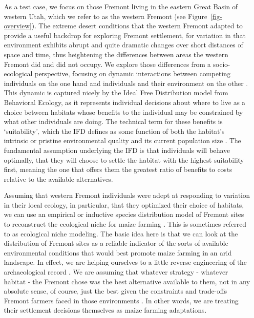 \documentclass[
  number,
  preprint,
  3p]{elsarticle}
\begin{document}
As a test case, we focus on those Fremont living in the eastern Great
Basin of western Utah, which we refer to as the western Fremont (see
Figure~\ref{fig-overview}). The extreme desert conditions that the
western Fremont adapted to provide a useful backdrop for exploring
Fremont settlement, for variation in that environment exhibits abrupt
and quite dramatic changes over short distances of space and time, thus
heightening the differences between areas the western Fremont did and
did not occupy. We explore those differences from a socio-ecological
perspective, focusing on dynamic interactions between competing
individuals on the one hand and individuals and their environment on the
other \citep{bird2006, kennett2006a}. This dynamic is captured nicely by
the Ideal Free Distribution model from Behavioral Ecology, as it
represents individual decisions about where to live as a choice between
habitats whose benefits to the individual may be constrained by what
other individuals are doing. The technical term for these benefits is
`suitability', which the IFD defines as some function of both the
habitat's intrinsic or pristine environmental quality and its current
population size \citep{fretwell1969, codding2015, winterhalder2010}. The
fundamental assumption underlying the IFD is that individuals will
behave optimally, that they will choose to settle the habitat with the
highest suitability first, meaning the one that offers them the greatest
ratio of benefits to costs relative to the available alternatives.

Assuming that western Fremont individuals were adept at responding to
variation in their local ecology, in particular, that they optimized
their choice of habitats, we can use an empirical or inductive species
distribution model of Fremont sites to reconstruct the ecological niche
for maize farming \citep{vernon2021, yaworsky2020, elith2009}. This is
sometimes referred to as ecological niche modeling. The basic idea here
is that we can look at the distribution of Fremont sites as a reliable
indicator of the sorts of available environmental conditions that would
best promote maize farming in an arid landscape. In effect, we are
helping ourselves to a little reverse engineering of the archaeological
record \citep{dennett1995}. We are assuming that whatever strategy -
whatever habitat - the Fremont chose was the best alternative available
to them, not in any absolute sense, of course, just the best given the
constraints and trade-offs Fremont farmers faced in those environments
\citep{jochim2022}. In other words, we are treating their settlement
decisions themselves as maize farming adaptations.
\end{document}
